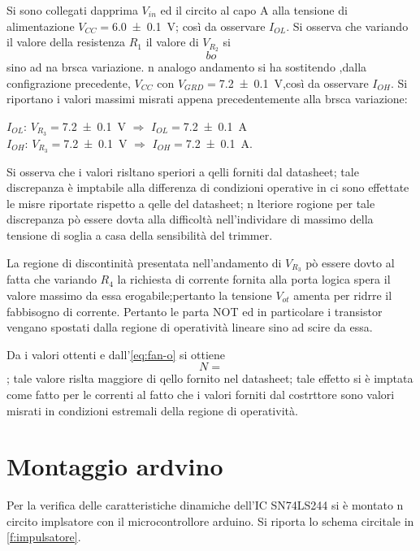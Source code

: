 	Si sono collegati dapprima $V_{in}$ ed il circito al capo A alla tensione di alimentazione $V_{CC}=$\SI{6.0 \pm 0.1}{\volt}; così da osservare $I_{OL}$.
	Si osserva che variando il valore della resistenza $R_{1}$ il
	valore di  $V_{R_{2}}$  si $$bo$$ sino ad na brsca variazione.
	n analogo andamento si ha sostitendo ,dalla configrazione precedente, $V_{CC}$
	con  $V_{GRD}=$\SI{7.2 \pm 0.1}{\volt},così da osservare $I_{OH}$.
	Si riportano i valori massimi misrati appena precedentemente  alla brsca variazione:\\
	\begin{center}
	
	\bigskip
	$I_{OL}$: $V_{R_{3}}=$\SI{7.2 \pm 0.1}{\volt} 
	$\Rightarrow$ $I_{OL}=$\SI{7.2 \pm 0.1}{\ampere}\\

	$I_{OH}$: $V_{R_{3}}=$\SI{7.2 \pm 0.1}{\volt} 
	$\Rightarrow$ $I_{OH}=$\SI{7.2 \pm 0.1}{\ampere}.\\
	\end{center}
	Si osserva che i valori risltano speriori a qelli forniti dal datasheet;
	tale discrepanza è imptabile alla differenza di condizioni operative in ci sono effettate le misre riportate rispetto a qelle del datasheet;
	n lteriore rogione per tale discrepanza pò essere dovta alla difficoltà nell'individare di massimo della tensione di soglia a casa della sensibilità del trimmer. 
	
	La regione di discontinità presentata nell'andamento di $V_{R_{3}}$
	pò essere dovto al fatta che variando $R_{4}$ la richiesta di corrente fornita alla porta logica spera il valore massimo da essa erogabile;pertanto la tensione $V_{ot}$ amenta per ridrre il fabbisogno di corrente.
	Pertanto le parta NOT ed in particolare i transistor vengano spostati dalla regione di operatività lineare sino ad scire da  essa.
	
	Da i valori ottenti e dall'\eqref{eq:fan-o} si ottiene $$N=$$; tale valore rislta maggiore di qello fornito nel datasheet; tale effetto si è imptata come fatto per le correnti al fatto che i valori forniti dal costrttore sono valori misrati in condizioni estremali della regione di operatività.
	
\section{Montaggio ardvino}
	Per la verifica delle caratteristiche dinamiche dell'IC SN74LS244 si è montato n circito implsatore con il microcontrollore arduino.
	Si riporta lo schema circitale in \figurename{ \ref{f:impulsatore}}. 
	
